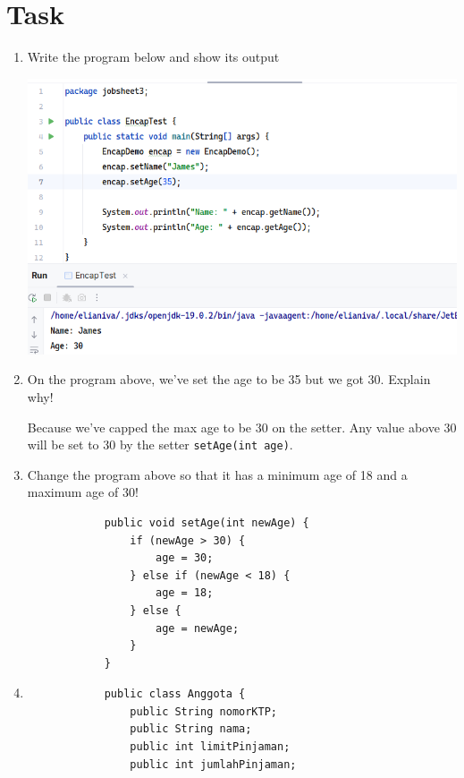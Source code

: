 \documentclass[12pt,titlepage]{article}
\begin{document}
\pagebreak

\section{Task}
\begin{enumerate}
    \item {
        Write the program below and show its output

        \begin{center}
            \includegraphics[width=.8\textwidth]{./images/task-1.png}
        \end{center}
    }
    \item {
        On the program above, we've set the age to be 35 but we got 30. Explain why!

        Because we've capped the max age to be 30 on the setter. Any value above 30 will be set to 30
        by the setter \texttt{setAge(int age)}.
    }
    \item {
        Change the program above so that it has a minimum age of 18 and a maximum age of 30!

        \begin{verbatim}
            public void setAge(int newAge) {
                if (newAge > 30) {
                    age = 30;
                } else if (newAge < 18) {
                    age = 18;
                } else {
                    age = newAge;
                }
            }
        \end{verbatim}
    }
    \item {
        \begin{verbatim}
            public class Anggota {
                public String nomorKTP;
                public String nama;
                public int limitPinjaman;
                public int jumlahPinjaman;


\end{verbatim}}
\end{enumerate}
\end{document}
